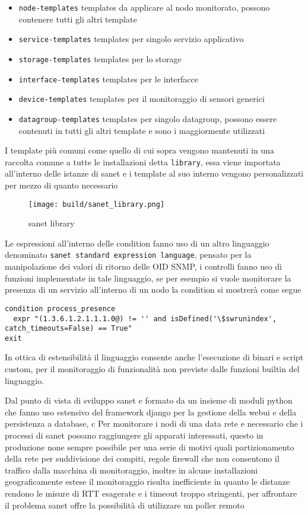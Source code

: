 \begin{itemize}
  \item \verb|node-templates| templates da applicare al nodo monitorato, possono contenere tutti gli altri template
  \item \verb|service-templates| templates per singolo servizio applicativo
  \item \verb|storage-templates| templates per lo storage
  \item \verb|interface-templates| templates per le interfacce
  \item \verb|device-templates| templates per il monitoraggio di sensori generici
  \item \verb|datagroup-templates| templates per singolo datagroup, possono essere contenuti in tutti gli altri template e sono i maggiormente utilizzati
\end{itemize}

I template più comuni come quello di cui sopra vengono mantenuti in una raccolta comune a tutte le installazioni detta \verb|library|, essa viene importata all'interno delle istanze di sanet e i template al suo interno vengono personalizzati per mezzo di quanto necessario

\begin{figure}[H]
    \centering
    \texttt{[image: build/sanet\_library.png]}
    \caption{sanet library}
    \label{fig:enter-label}
\end{figure}

Le espressioni all'interno delle condition fanno uso di un altro linguaggio denominato \verb|sanet standard expression language|, pensato per la manipolazione dei valori di ritorno delle OID SNMP, i controlli fanno uso di funzioni implementate in tale linguaggio, se per esempio si vuole monitorare la presenza di un servizio all'interno di un nodo la condition si mostrerà come segue

\begin{lstlisting}
condition process_presence
  expr "(1.3.6.1.2.1.1.1.0@) != '' and isDefined('\$swrunindex', catch_timeouts=False) == True"
exit
\end{lstlisting}

In ottica di estensibilità il linguaggio consente anche l'esecuzione di binari e script custom, per il monitoraggio di funzionalità non previste dalle funzioni builtin del linguaggio.

Dal punto di vista di sviluppo sanet e formato da un insieme di moduli python che fanno uso estensivo del framework django per la gestione della webui e della persistenza a database,
c
Per monitorare i nodi di una data rete e necessario che i processi di sanet possano raggiungere gli apparati interessati, questo in produzione none sempre possibile per una serie di motivi quali partizionamento della rete per suddivisione dei compiti, regole firewall che non consentono il traffico dalla macchina di monitoraggio, inoltre in alcune installazioni geograficamente estese il monitoraggio risulta inefficiente in quanto le distanze rendono le misure di RTT esagerate e i timeout troppo stringenti, per affrontare il problema sanet offre la possibilità di utilizzare un poller remoto

